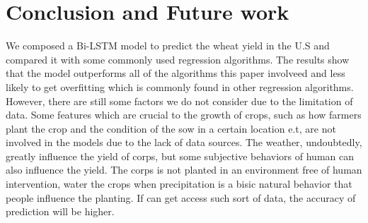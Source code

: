 \documentclass[conference, a4paper]{IEEEtran}
\begin{document}
\section{Conclusion and Future work} \label{sec:con}
  We composed a Bi-LSTM model to predict the wheat yield in the U.S and compared it with some commonly used regression algorithms. The results show that the model outperforms all of the algorithms this paper involveed and less likely to get overfitting which is commonly found in other regression algorithms. However, there are still some factors we do not consider due to the limitation of data. Some features which are crucial to the growth of crops, such as how farmers plant the crop and the condition of the sow in a certain location e.t, are not involved in the models due to the lack of data sources. The weather, undoubtedly, greatly influence the yield of corps, but some subjective behaviors of human can also influence the yield. The corps is not planted in an environment free of human intervention, water the crops when precipitation is a bisic natural behavior that people influence the planting. If can get access such sort of data, the accuracy of prediction will be higher. 



\end{document}
